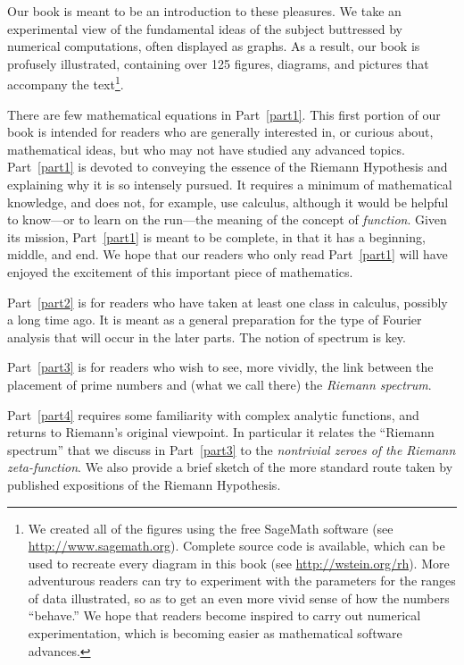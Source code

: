 \documentclass[openany]{book}
\theoremstyle{plain}
\theoremstyle{definition}
\begin{document}
    Our book is meant to be an introduction to these pleasures. We take an experimental view of the fundamental ideas of the subject  buttressed by numerical computations, often displayed as graphs. As a result, our book is profusely illustrated, containing over 125 figures,
diagrams, and pictures that accompany the text\footnote{We created all of the
  figures using the free SageMath
  software (see \url{http://www.sagemath.org}).
Complete source code is available, which
can be used to recreate every diagram in this book
(see \url{http://wstein.org/rh}).
More adventurous readers can try
to experiment with the parameters for
the ranges of data illustrated, so as to get an even more
vivid sense of how the numbers ``behave.''
We hope that readers become inspired to carry out numerical experimentation,
which is becoming easier  as mathematical software
advances.}.

  There are  few
mathematical equations in Part~\ref{part1}.  This first portion of our book is intended for readers who are generally interested in, or curious about, mathematical ideas, but who may not have studied any advanced topics. Part~\ref{part1} is devoted to conveying the essence of the Riemann Hypothesis and explaining why it is so intensely pursued. It requires a minimum of mathematical knowledge, and does not,  for example, use calculus, although it would be helpful to know---or to learn on the run---the meaning of  the concept of {\it function}. Given its mission, Part~\ref{part1}  is meant to be complete, in that it has a beginning, middle, and end.  We hope that our readers who only read Part~\ref{part1} will have enjoyed the excitement  of this important piece of mathematics.



    Part~\ref{part2} is for readers who have taken at least one class in calculus, possibly a long time ago.  It is meant as a general preparation for the type of Fourier analysis that will occur in the later parts. The notion of spectrum is key.

    Part~\ref{part3} is for readers who wish to see, more vividly, the link between the placement of prime numbers and (what we call there) the {\it Riemann spectrum}.

    Part~\ref{part4} requires some familiarity with complex analytic functions, and returns to Riemann's original viewpoint.  In particular it  relates the ``Riemann spectrum'' that we discuss in Part~\ref{part3} to the {\it nontrivial zeroes of the Riemann zeta-function}. We also provide a brief sketch of the more standard route taken by published expositions of the Riemann Hypothesis.
\end{document}
